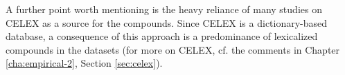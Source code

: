 


A further point worth mentioning is the heavy reliance of many studies on CELEX
\nocite{Baayenetal:1995} as a source for the compounds. Since CELEX is
a dictionary-based database, a consequence of this approach is a
predominance of lexicalized compounds in the datasets (for more on
CELEX, cf. the comments in Chapter \ref{cha:empirical-2}, Section
\ref{sec:celex}).  


